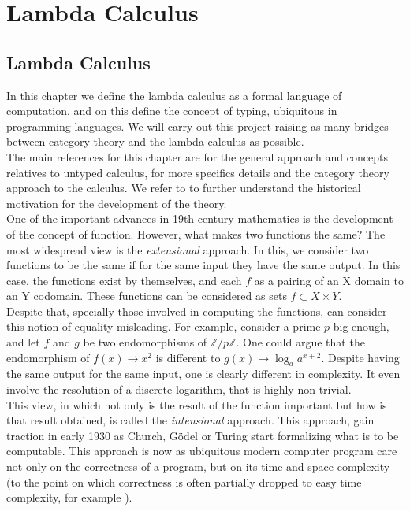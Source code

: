 \part{Lambda Calculus}
\label{Part2}

\chapter{Lambda Calculus}

In this chapter we define the lambda calculus as a formal language of computation, and on this define the concept of typing, ubiquitous in programming languages. We will carry out this project raising as many bridges between category theory and the lambda calculus as possible.\\

The main references for this chapter are \cite{selinger2008lecture} for the general approach and concepts relatives to untyped calculus, \cite{lambek1988introduction} for more specifics details and the category theory approach to the calculus. We refer to \cite{cardone2006history} to further understand the historical motivation for the development of the theory.  \\


One of the important advances in 19th century mathematics is the development of the concept of function. However, what makes two functions the same? The most widespread view is the \emph{extensional} approach. In this, we consider two functions to be the same if for the same input they have the same output. In this case, the functions exist by themselves, and each $f$ as a pairing of an X domain to an Y codomain. These functions can  be considered as sets $f\subset X \times Y$.\\

Despite that, specially those involved in computing the functions, can consider this notion of equality misleading. For example, consider a prime $p$ big enough, and let $f$ and $g$ be two endomorphisms of  $\mathbb{Z}/p\mathbb{Z}$. One could argue that the endomorphism of  $f(x)\to x^2$ is different to $g(x) \to \log_a a^{x+2}$. Despite having the same output for the same input, one is clearly different in complexity. It even involve the resolution of a discrete logarithm, that is highly non trivial. \\

This view, in which not only is the result of the function important but how is that result obtained, is called the \emph{intensional} approach. This approach, gain traction in early 1930 as Church\cite{church1932set}, Gödel\cite{adams2011early} or Turing\cite{turing1938computable} start formalizing what is to be computable. This approach is now as ubiquitous modern computer program care not only on the correctness of a program, but on its time and space complexity (to the point on which correctness is often partially dropped to easy time complexity, for example \cite{hofmeister2002probabilistic}). \\

